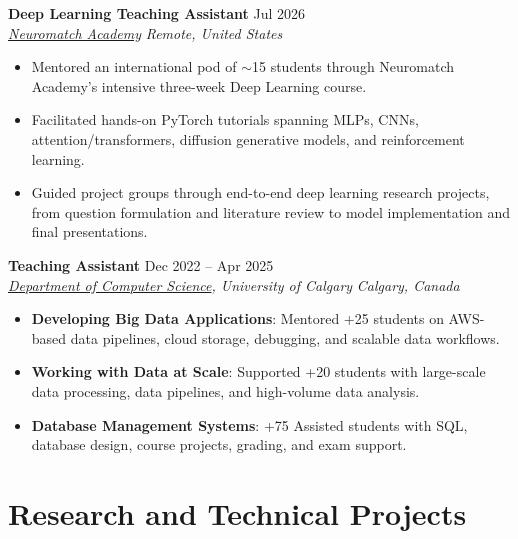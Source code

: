 \documentclass[a4paper,10pt]{article}
\newcommand{\resumeSubheading}[4]{
    \textbf{#1} \hfill #2 \\
    \textit{#3} \hfill \textit{#4}
}
\begin{document}
\resumeSubheading
{Deep Learning Teaching Assistant}
{Jul 2026}
{\href{https://neuromatch.io/}{Neuromatch Academy}}
{Remote, United States}
\begin{itemize}[leftmargin=0.25in]
    \item Mentored an international pod of $\sim$15 students through Neuromatch Academy's intensive three-week Deep Learning course.
    \item Facilitated hands-on PyTorch tutorials spanning MLPs, CNNs, attention/transformers, diffusion generative models, and reinforcement learning.
    \item Guided project groups through end-to-end deep learning research projects, from question formulation and literature review to model implementation and final presentations.
\end{itemize}

\resumeSubheading
{Teaching Assistant}
{Dec 2022 -- Apr 2025}
{\href{https://science.ucalgary.ca/computer-science} {Department of Computer Science}, University of Calgary}
{Calgary, Canada}
\begin{itemize}[leftmargin=0.25in]
    \item \textbf{Developing Big Data Applications}: Mentored +25 students on AWS-based data pipelines, cloud storage, debugging, and scalable data workflows. 
    \item \textbf{Working with Data at Scale}: Supported +20 students with large-scale data processing, data pipelines, and high-volume data analysis. 
    \item \textbf{Database Management Systems}: +75 Assisted students with SQL, database design, course projects, grading, and exam support.
\end{itemize}


\section*{Research and Technical Projects}
\end{document}
